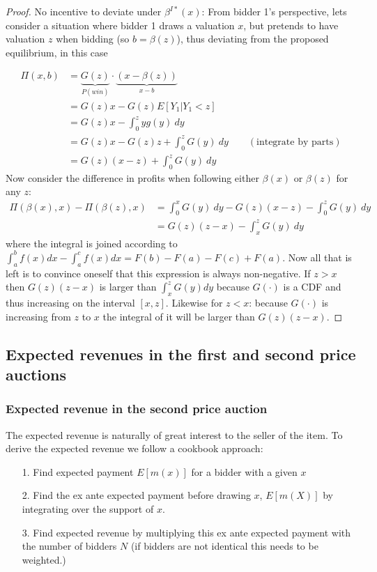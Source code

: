 \begin{proof}{No incentive to deviate under $\beta^{I*}(x)$:} From bidder 1's perspective, lets consider a situation where bidder 1 draws a valuation $x$, but pretends to have valuation $z$ when bidding (so $b = \beta(z)$), thus deviating from the proposed equilibrium, in this case

  \begin{equation}
    \begin{split}
      \Pi(x, b) &= \underbrace{G(z)}_{P(win)} \cdot \underbrace{(x - \beta(z))}_{x - b} \\
      &= G(z) x - G(z)E[Y_1 | Y_1 < z] \\
      &= G(z) x - \int_0^z yg(y) \ dy \\
      &= G(z) x - G(z) z + \int_0^z G(y) \ dy \qquad (\textrm{integrate by parts}) \\
      &= G(z)(x-z) + \int_0^z G(y) \ dy
    \end{split}
  \end{equation}
Now consider the difference in profits when following either $\beta(x)$ or $\beta(z)$ for any $z$:
\begin{equation}
  \begin{split}
    \Pi(\beta(x), x) - \Pi(\beta(z), x) &= \int_0^x G(y) \ dy - G(z)(x-z) - \int_0^z G(y) \ dy \\
    &= G(z)(z-x) - \int_x^z G(y) \ dy
  \end{split}
\end{equation}
where the integral is joined according to $\int_a^b f(x) dx - \int_a^c f(x) dx = F(b)-F(a)-F(c)+F(a)$. Now all that is left is to convince oneself that this expression is always non-negative. If $z>x$ then $G(z)(z-x)$ is larger than $\int_x^z G(y) dy$ because $G(\cdot)$ is a CDF and thus increasing on the interval $[x,z]$. Likewise for $z<x$: because $G(\cdot)$ is increasing from $z$ to $x$ the integral of it will be larger than $G(z)(z-x)$.
\end{proof}

\subsection{Expected revenues in the first and second price auctions}
\subsubsection{Expected revenue in the second price auction}
The expected revenue is naturally of great interest to the seller of the item. To derive the expected revenue we follow a cookbook approach:
\begin{itemize}
  \item[1.] Find expected payment $E[m(x)]$ for a bidder with a given $x$
  \item[2.] Find the ex ante expected payment before drawing $x$, $E[m(X)]$ by integrating over the support of $x$.
  \item[3.] Find expected revenue by multiplying this ex ante expected payment with the number of bidders $N$ (if bidders are not identical this needs to be weighted.)
\end{itemize}

